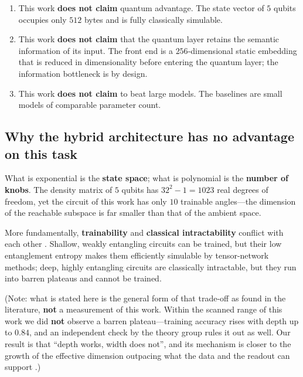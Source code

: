 \documentclass{article}
\begin{document}
\begin{enumerate}
\item
  This work \textbf{does not claim} quantum advantage. The state vector
  of \(5\) qubits occupies only \(512\) bytes and is fully classically
  simulable.
\item
  This work \textbf{does not claim} that the quantum layer retains the
  semantic information of its input. The front end is a
  \(256\)-dimensional static embedding that is reduced in dimensionality
  before entering the quantum layer; the information bottleneck is by
  design.
\item
  This work \textbf{does not claim} to beat large models. The baselines
  are small models of comparable parameter count.
\end{enumerate}

\subsection{Why the hybrid architecture has no advantage on this task}

What is exponential is the \textbf{state space}; what is polynomial is
the \textbf{number of knobs}. The density matrix of \(5\) qubits has
\(32^{2} - 1 = 1023\) real degrees of freedom, yet the circuit of this
work has only \(10\) trainable angles---the dimension of the reachable
subspace is far smaller than that of the ambient space.

More fundamentally, \textbf{trainability} and \textbf{classical
intractability} conflict with each other
\cite{anschuetz2024}\cite{cerezo2025}\cite{gilfuster2024}. Shallow, weakly
entangling circuits can be trained, but their low entanglement entropy
makes them efficiently simulable by tensor-network methods; deep, highly
entangling circuits are classically intractable, but they run into
barren plateaus and cannot be trained.

(Note: what is stated here is the general form of that trade-off as
found in the literature, \textbf{not} a measurement of this work. Within
the scanned range of this work we did \textbf{not} observe a barren
plateau---training accuracy rises with depth up to \(0.84\), and an
independent check by the theory group rules it out as well. Our result
is that ``depth works, width does not'', and its mechanism is closer to
the growth of the effective dimension outpacing what the data and the
readout can support
\cite{caro2022generalization}\cite{abbas2021power}\cite{abbas2022effective}.)
\end{document}
